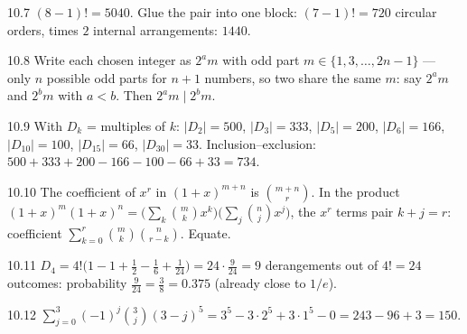 \begin{solution}{10.7}
$(8-1)! = 5040$. Glue the pair into one block: $(7-1)! = 720$ circular
orders, times $2$ internal arrangements: $1440$.
\end{solution}

\begin{solution}{10.8}
Write each chosen integer as $2^{a} m$ with odd part
$m \in \{1, 3, \ldots, 2n-1\}$ --- only $n$ possible odd parts for $n+1$
numbers, so two share the same $m$: say $2^{a}m$ and $2^{b}m$ with $a < b$.
Then $2^{a}m \mid 2^{b}m$.
\end{solution}

\begin{solution}{10.9}
With $D_k$ = multiples of $k$: $|D_2| = 500$, $|D_3| = 333$, $|D_5| = 200$,
$|D_6| = 166$, $|D_{10}| = 100$, $|D_{15}| = 66$, $|D_{30}| = 33$.
Inclusion--exclusion: $500 + 333 + 200 - 166 - 100 - 66 + 33 = 734$.
\end{solution}

\begin{solution}{10.10}
The coefficient of $x^{r}$ in $(1+x)^{m+n}$ is $\binom{m+n}{r}$. In the
product $(1+x)^m (1+x)^n = \bigl(\sum_k \binom{m}{k}x^k\bigr)
\bigl(\sum_j \binom{n}{j}x^j\bigr)$, the $x^{r}$ terms pair $k + j = r$:
coefficient $\sum_{k=0}^{r} \binom{m}{k}\binom{n}{r-k}$. Equate.
\end{solution}

\begin{solution}{10.11}
$D_4 = 4!\bigl(1 - 1 + \tfrac12 - \tfrac16 + \tfrac1{24}\bigr) = 24 \cdot
\tfrac{9}{24} = 9$ derangements out of $4! = 24$ outcomes: probability
$\frac{9}{24} = \frac38 = 0.375$ (already close to $1/e$).
\end{solution}

\begin{solution}{10.12}
$\sum_{j=0}^{3} (-1)^{j} \binom{3}{j} (3-j)^{5}
= 3^5 - 3 \cdot 2^5 + 3 \cdot 1^5 - 0 = 243 - 96 + 3 = 150$.
\end{solution}
